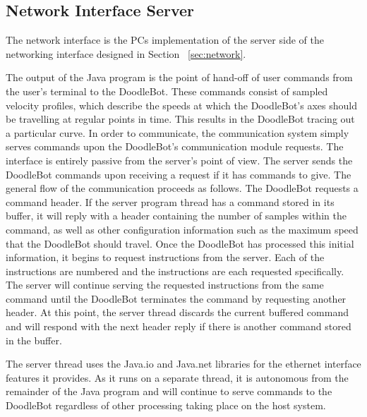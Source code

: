 \subsection{Network Interface Server}
\label{sec:pc-network}
The network interface is the PCs implementation of the server side of the networking interface designed in Section ~\ref{sec:network}.

The output of the Java program is the point of hand-off of user commands from the user's terminal to the DoodleBot. These commands consist of sampled velocity profiles, which describe the speeds at which the DoodleBot's axes should be travelling at regular points in time. This results in the DoodleBot tracing out a particular curve. In order to communicate, the communication system simply serves commands upon the DoodleBot's communication module requests. The interface is entirely passive from the server's point of view. The server sends the DoodleBot commands upon receiving a request if it has commands to give. The general flow of the communication proceeds as follows. The DoodleBot requests a command header. If the server program thread has a command stored in its buffer, it will reply with a header containing the number of samples within the command, as well as other configuration information such as the maximum speed that the DoodleBot should travel. Once the DoodleBot has processed this initial information, it begins to request instructions from the server. Each of the instructions are numbered and the instructions are each requested specifically. The server will continue serving the requested instructions from the same command until the DoodleBot terminates the command by requesting another header. At this point, the server thread discards the current buffered command and will respond with the next header reply if there is another command stored in the buffer.

The server thread uses the Java.io and Java.net libraries for the ethernet interface features it provides. As it runs on a separate thread, it is autonomous from the remainder of the Java program and will continue to serve commands to the DoodleBot regardless of other processing taking place on the host system.